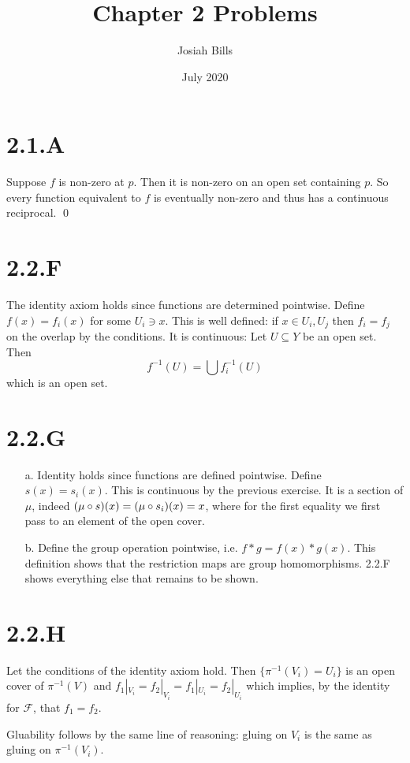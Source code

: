 \documentclass{article}
\title{Chapter 2 Problems}
\author{Josiah Bills}
\date{July 2020}
\begin{document}
\maketitle

\section*{2.1.A}
Suppose $f$ is non-zero at $p$. Then it is non-zero on an open set containing $p$. So every
function equivalent to $f$ is eventually non-zero and thus has a continuous reciprocal. \qed

\section*{2.2.F}
The identity axiom holds since functions are determined pointwise.
Define $f(x)=f_i(x)$ for some $U_i \ni x$. This is well defined: if $x \in U_i, U_j$ then
$f_i=f_j$ on the overlap by the conditions. It is continuous: Let $U \subseteq Y$ be an open set.
Then
\[
    f^{-1}(U) = \bigcup f_i^{-1}(U)
\]
which is an open set.

\section*{2.2.G}
\begin{itemize}
    \item[a.] Identity holds since functions are defined pointwise.
          Define $s(x)=s_i(x)$. This is continuous by the previous exercise. It is a section of $\mu$,
          indeed $(\mu \circ s)(x)=(\mu \circ s_i)(x)=x$, where for the first equality we first pass
          to an element of the open cover.
    \item[b.] Define the group operation pointwise, i.e. $f*g=f(x)*g(x)$. This definition
          shows that the restriction maps are group homomorphisms. 2.2.F shows everything else that remains to be shown.
\end{itemize}

\section*{2.2.H}
Let the conditions of the identity axiom hold. Then $\{\pi^{-1}(V_i)=U_i\}$ is an open cover of
$\pi^{-1}(V)$ and $f_1 |_{V_i}=f_2 |_{V_i}=f_1|_{U_i}=f_2|_{U_i}$ which implies, by the identity
for $\mathscr{F}$, that $f_1=f_2$.

Gluability follows by the same line of reasoning: gluing on $V_i$ is the same as gluing
on $\pi^{-1}(V_i)$.
\end{document}
